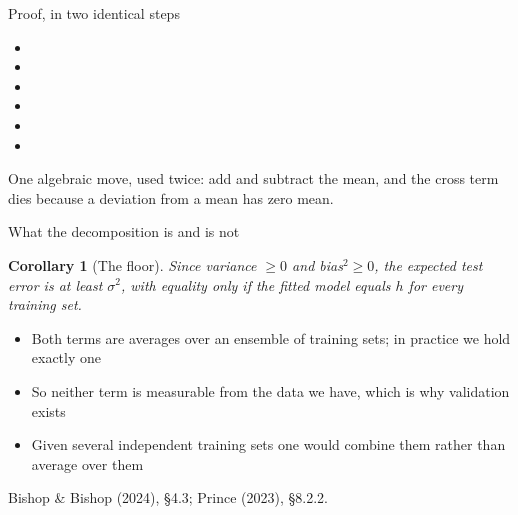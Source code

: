 \documentclass[aspectratio=169, 11pt]{beamer}
\newtheorem{corx}[theorem]{Corollary}
\newcommand{\srcline}[1]{%
  \par\vspace{0.25em}%
  {\scriptsize\color{mcMuted}\hfill #1\par}}
\begin{document}
\begin{frame}{Proof, in two identical steps}
  \vspace{-0.3em}
  {\footnotesize
  \begin{itemize}\itemsep0.30em
    \item {}
    \item {}
    \item {}
    \item {}
    \item {}
    \item {}
  \end{itemize}}
  \vspace{-0.15em}
  \begin{redhighlight}
    One algebraic move, used twice: add and subtract the mean, and the
    cross term dies because a deviation from a mean has zero mean.
  \end{redhighlight}
\end{frame}

\begin{frame}{What the decomposition is and is not}
  \vspace{0.15em}
  \begin{corx}[The floor]\label{th:floor}
    \small
    Since variance $\geq 0$ and bias$^2 \geq 0$, the expected test error
    is at least $\sigma^2$, with equality only if the fitted model
    equals $h$ for every training set.
  \end{corx}
  \vspace{0.25em}
  \begin{itemize}\itemsep0.3em
    \item Both terms are averages over an \alert{ensemble} of training
          sets; in practice we hold exactly one
    \item So neither term is measurable from the data we have, which is
          why validation exists
    \item Given several independent training sets one would combine
          them rather than average over them
  \end{itemize}
  \srcline{Bishop \& Bishop (2024), \S4.3; Prince (2023), \S8.2.2.}
\end{frame}
\end{document}
